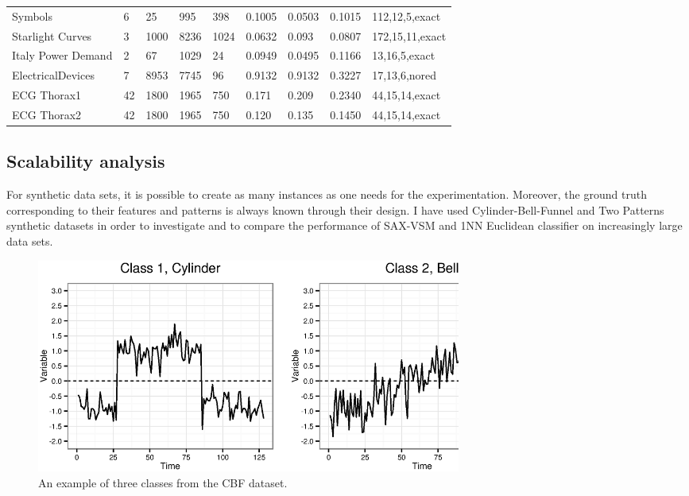 \begin{table}[t!]
{{\begin{tabularx}{\linewidth}{@{} l *7X @{} l}
Symbols & 6 & 25 & 995 & 398 & 0.1005 & 0.0503 & 0.1015 & 112,12,5,exact \\
Starlight Curves & 3 & 1000 & 8236 & 1024 & 0.0632 & 0.093 & 0.0807 & 172,15,11,exact \\
Italy Power Demand & 2 & 67 & 1029 & 24 & 0.0949 & 0.0495 & 0.1166 & 13,16,5,exact \\
ElectricalDevices & 7 & 8953 & 7745 & 96 & 0.9132 & 0.9132 & 0.3227 & 17,13,6,nored \\
ECG Thorax1 & 42 & 1800 & 1965 & 750 & 0.171 & 0.209 & 0.2340 & 44,15,14,exact \\
ECG Thorax2 & 42 & 1800 & 1965 & 750 & 0.120 & 0.135 & 0.1450 & 44,15,14,exact \\
\hline
\end{tabularx}
}}
\end{table}

\clearpage

\subsection{Scalability analysis} \label{scalability}
For synthetic data sets, it is possible to create as many instances as one needs for the experimentation. 
Moreover, the ground truth corresponding to their features and patterns is always known through their design.
I have used Cylinder-Bell-Funnel \cite{citeulike:12563781} and Two Patterns \cite{two_patterns} synthetic datasets 
in order to investigate and to compare the performance of SAX-VSM and 1NN Euclidean classifier on increasingly 
large data sets.

\begin{figure}[t]
   \centering
   \includegraphics[width=140mm]{figures/cbf.ps}
   \caption{An example of three classes from the CBF dataset.}
   \label{fig:cbf}
\end{figure}

